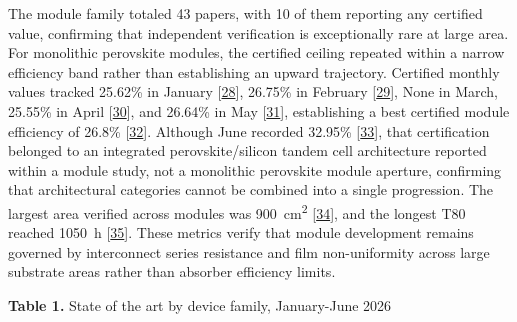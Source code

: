 \documentclass[
  11pt,
]{article}
\begin{document}
The module family totaled 43 papers, with 10 of them reporting any
certified value, confirming that independent verification is
exceptionally rare at large area. For monolithic perovskite modules, the
certified ceiling repeated within a narrow efficiency band rather than
establishing an upward trajectory. Certified monthly values tracked
25.62\% in January
{[}\href{https://doi.org/10.1038/s41467-025-68231-0}{28}{]}, 26.75\% in
February {[}\href{https://doi.org/10.1002/anie.202525815}{29}{]}, None
in March, 25.55\% in April
{[}\href{https://doi.org/10.1126/sciadv.aec3238}{30}{]}, and 26.64\% in
May {[}\href{https://doi.org/10.1002/adma.73286}{31}{]}, establishing a
best certified module efficiency of 26.8\%
{[}\href{https://doi.org/10.1002/adma.73855}{32}{]}. Although June
recorded 32.95\%
{[}\href{https://doi.org/10.1038/s41467-026-73276-w}{33}{]}, that
certification belonged to an integrated perovskite/silicon tandem cell
architecture reported within a module study, not a monolithic perovskite
module aperture, confirming that architectural categories cannot be
combined into a single progression. The largest area verified across
modules was \qty{900}{\centi\meter\squared}
{[}\href{https://doi.org/10.1002/adfm.202532205}{34}{]}, and the longest
T80 reached \qty{1050}{\hour}
{[}\href{https://doi.org/10.1007/s40820-025-02058-8}{35}{]}. These
metrics verify that module development remains governed by interconnect
series resistance and film non-uniformity across large substrate areas
rather than absorber efficiency limits.

\textbf{Table 1.} State of the art by device family, January-June 2026
\end{document}
